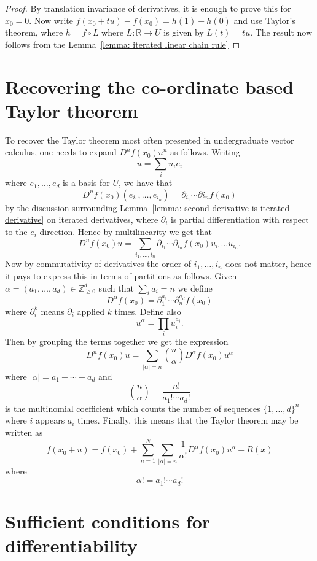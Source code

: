 \documentclass[twoside, a4paper, 10pt]{amsart}
\begin{document}
\begin{proof} By translation invariance of derivatives, it is enough to prove this for $x_0 = 0$. Now write $f(x_0 + tu) - f(x_0) = h(1) - h(0)$ and use Taylor's theorem, where $h = f \circ L$ where $L:\mathbb{R} \to U$ is given by $L(t) = tu$. The result now follows from the Lemma~\ref{lemma: iterated linear chain rule} 
\end{proof}

\section{Recovering the co-ordinate based Taylor theorem}

To recover the Taylor theorem most often presented in undergraduate vector calculus, one needs to expand $D^nf(x_0) u^n$ as follows. Writing $$u = \sum_i u_i e_i$$ where $e_1, \ldots, e_d$ is a basis for $U$, we have that $$D^nf(x_0) (e_{i_1}, \ldots, e_{i_n}) = \partial_{i_1} \cdots \partial{i_n}f(x_0)$$ by the discussion surrounding Lemma~\ref{lemma: second derivative is iterated derivative} on iterated derivatives, where $\partial_i$ is partial differentiation with respect to the $e_i$ direction. Hence by multilinearity we get that $$D^nf(x_0)u = \sum_{i_1, \ldots, i_n} \partial_{i_1} \cdots \partial_{i_n}f(x_0) u_{i_1} \ldots u_{i_n}.$$ Now by commutativity of derivatives the order of $i_1, \ldots, i_n$ does not matter, hence it pays to express this in terms of partitions as follows. Given $\alpha = (a_1, \ldots, a_d) \in \mathbb{Z}_{\geq 0}^d$ such that $\sum_i a_i = n$ we define $$D^{\alpha}f(x_0) = \partial_1^{a_1} \cdots \partial_n^{a_d} f(x_0)$$ where $\partial_i^{k}$ means $\partial_i$ applied $k$ times. Define also $$u^{\alpha} = \prod_{i} u_i^{a_i}.$$ Then by grouping the terms together we get the expression $$D^n f(x_0) u = \sum_{|\alpha| = n} \binom{n}{\alpha} D^{\alpha}f(x_0) u ^{\alpha}$$ where $|\alpha| = a_1 + \cdots + a_d$ and $$\binom{n}{\alpha} = \frac{n!}{a_1 ! \cdots a_d!}$$ is the multinomial coefficient which counts the number of sequences $\{1, \ldots, d\}^n$ where $i$ appears $a_i$ times. Finally, this means that the Taylor theorem may be written as $$ f(x_0 + u ) = f(x_0) + \sum_{n=1}^N \sum_{|\alpha| = n} \frac{1}{\alpha!} D^{\alpha}f(x_0) u^{\alpha}  + R(x) $$ where $$ \alpha! = a_1! \cdots a_d!$$

\section{Sufficient conditions for differentiability}
\end{document}
